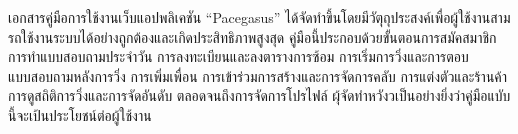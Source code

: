 เอกสารคู่มือการใช้งานเว็บแอปพลิเคชัน “Pacegasus” ได้จัดทำขึ้นโดยมีวัตุถุประสงค์เพื่อผู้ใช้งานสามรถใช้งานระบบได้อย่างถูกต้องและเกิดประสิทธิภาพสูงสุด คู่มือนี้ประกอบด้วยขั้นตอนการสมัคสมาชิก การทำแบบสอบถามประจำวัน การลงทะเบียนและลงตารางการซ้อม การเริ่มการวิ่งและการตอบแบบสอบถามหลังการวิ่ง การเพิ่มเพื่อน การเข้าร่วมการสร้างและการจัดการคลับ การแต่งตัวและร้านค้า การดูสถิติการวิ่งและการจัดอันดับ ตลอดจนถึงการจัดการโปรไฟล์ ผุ้จัดทำหวังวเป็นอย่างยิ่งว่าคู่มือแบับนี้จะเป้นประโยชน์ต่อผู้ใช้งาน
